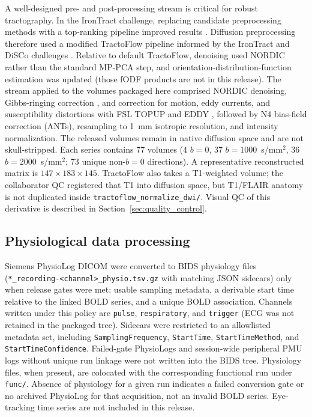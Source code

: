 A well-designed pre- and post-processing stream is critical for robust tractography. In the IronTract challenge, replacing candidate preprocessing methods with a top-ranking pipeline improved results \cite{maffei2022irontract}. Diffusion preprocessing therefore used a modified TractoFlow pipeline \cite{theaud2020tractoflow} informed by the IronTract and DiSCo challenges \cite{girard2023disco}. Relative to default TractoFlow, denoising used NORDIC \cite{moeller2021nordic} rather than the standard MP-PCA step, and orientation-distribution-function estimation was updated (those fODF products are not in this release). The stream applied to the volumes packaged here comprised NORDIC denoising, Gibbs-ringing correction \cite{kellner2016gibbs}, and correction for motion, eddy currents, and susceptibility distortions with FSL TOPUP and EDDY \cite{andersson2003topup,andersson2016eddy}, followed by N4 bias-field correction (ANTs), resampling to 1~mm isotropic resolution, and intensity normalization. The released volumes remain in native diffusion space and are not skull-stripped. Each series contains 77 volumes (4 $b=0$, 37 $b=1000$~s/mm$^2$, 36 $b=2000$~s/mm$^2$; 73 unique non-$b=0$ directions). A representative reconstructed matrix is $147 \times 183 \times 145$. TractoFlow also takes a T1-weighted volume; the collaborator QC registered that T1 into diffusion space, but T1/FLAIR anatomy is not duplicated inside \texttt{tractoflow\_normalize\_dwi/}. Visual QC of this derivative is described in Section~\ref{sec:quality_control}.

\subsection{Physiological data processing}
\label{sec:physiology_processing}

Siemens PhysioLog DICOM were converted to BIDS physiology files (\texttt{*_recording-<channel>\_physio.tsv.gz} with matching JSON sidecars) only when release gates were met: usable sampling metadata, a derivable start time relative to the linked BOLD series, and a unique BOLD association. Channels written under this policy are \texttt{pulse}, \texttt{respiratory}, and \texttt{trigger} (ECG was not retained in the packaged tree). Sidecars were restricted to an allowlisted metadata set, including \texttt{SamplingFrequency}, \texttt{StartTime}, \texttt{StartTimeMethod}, and \texttt{StartTimeConfidence}. Failed-gate PhysioLogs and session-wide peripheral PMU logs without unique run linkage were not written into the BIDS tree. Physiology files, when present, are colocated with the corresponding functional run under \texttt{func/}. Absence of physiology for a given run indicates a failed conversion gate or no archived PhysioLog for that acquisition, not an invalid BOLD series. Eye-tracking time series are not included in this release.

